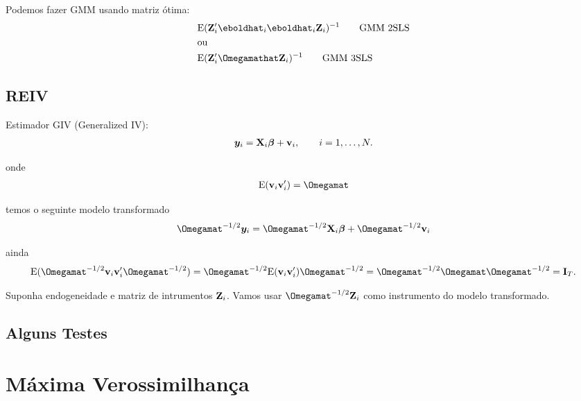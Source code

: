 \documentclass[11pt, oneside, a4paper, article]{article}
\numberwithin{equation}{section}
\begin{document}
\begin{description}
\begin{obs}
Podemos fazer GMM usando matriz ótima:
\begin{align*}
	& \E(\Wmat_{i}' \eboldhat_{i} \eboldhat_{i} \Wmat_{i})^{-1}
	\qquad \text{GMM 2SLS}
	\\ & \text{ou} \\
	& \E(\Wmat_{i}' \Omegamathat \Wmat_{i})^{-1}
	\qquad \text{GMM 3SLS}
\end{align*}

\end{obs}

\clearpage
\subsection{REIV}

Estimador GIV (Generalized IV):
\begin{align*}
\boldsymbol{y}_{i} = \mathbf{X}_{i} \boldsymbol{\beta} + \mathbf{v}_{i}, \qquad i=1, \dots, N.
\end{align*}

\noindent onde
\begin{align*}
\E(\vvec_{i} \vvec_{i}') = \Omegamat
\end{align*}

\noindent
temos o seguinte modelo transformado
\begin{align*}
\Omegamat^{-1/2} \yvec_{i} = \Omegamat^{-1/2}\Xmat_{i} \betavec + \Omegamat^{-1/2}\vvec_{i}
\end{align*}

\noindent ainda
\begin{align*}
\E(\Omegamat^{-1/2}\vvec_{i} \vvec_{i}'\Omegamat^{-1/2}) = 
\Omegamat^{-1/2}\E(\vvec_{i} \vvec_{i}')\Omegamat^{-1/2} =
\Omegamat^{-1/2}\Omegamat \Omegamat^{-1/2} = \Imat_{T}.
\end{align*}

Suponha endogeneidade e matriz de intrumentos $\mathbf{Z}_{i}$.
Vamos usar $\Omegamat^{-1/2} \Zmat_{i}$ como instrumento do modelo transformado.

\clearpage
\subsection{Alguns Testes}

\clearpage
\section{Máxima Verossimilhança}


\end{description}
\end{document}
